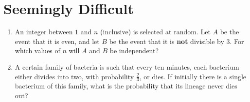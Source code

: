 \documentclass[svgnames]{amsart}
\begin{document}
\section{Seemingly Difficult}
\begin{enumerate}[leftmargin=*]
\item An integer between $1$ and $n$ (inclusive) is selected at random. Let $A$ be the event that it is even, and let $B$ be the event that it is \textbf{not} divisible by $3$. For which values of $n$ will $A$ and $B$ be independent?

\item A certain family of bacteria is such that every ten minutes, each bacterium either divides into two, with probability $\frac 2 3$, or dies. If initially there is a single bacterium of this family, what is the probability that its lineage never dies out?
\end{enumerate} %
\end{document}
